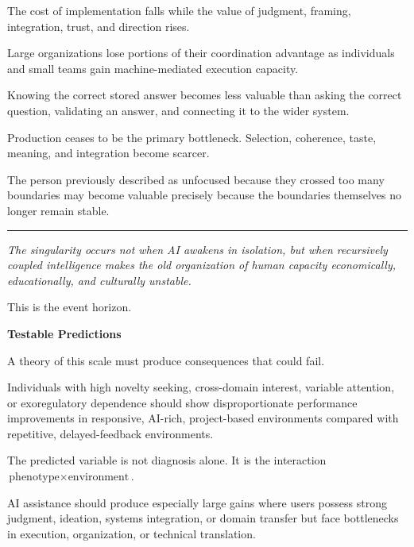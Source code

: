\documentclass[10pt]{article}
\newcommand{\ActiveAccent}{Industrial}
\newcommand{\papersection}[2]{%
  \Needspace{8\baselineskip}
  \vspace{1.1em}
  \noindent\begin{minipage}[t]{0.12\textwidth}
    \vspace{1pt}{\sffamily\bfseries\fontsize{17}{17}\selectfont\textcolor{\ActiveAccent}{#1}}
  \end{minipage}%
  \begin{minipage}[t]{0.86\textwidth}
    {\sffamily\bfseries\fontsize{16.2}{19}\selectfont #2}\par
    \vspace{0.35em}{\color{\ActiveAccent}\rule{\linewidth}{1.15pt}}
  \end{minipage}
  \vspace{0.55em}
}
\newcommand{\subhead}[1]{\Needspace{4\baselineskip}\vspace{0.5em}{\sffamily\bfseries\fontsize{10.5}{13}\selectfont\textcolor{\ActiveAccent}{#1}}\par\vspace{-0.1em}}
\newcommand{\pullquote}[1]{%
  \begin{center}\vspace{0.45em}
  \begin{minipage}{0.88\linewidth}
  {\color{\ActiveAccent}\rule{0.28in}{2.2pt}}\par\vspace{0.45em}
  {\fontsize{13.5}{18}\selectfont\itshape #1}\par
  \vspace{0.5em}{\color{\ActiveAccent}\rule{0.28in}{2.2pt}}
  \end{minipage}\vspace{0.45em}\end{center}
}
\begin{document}
\subhead{Economic inversion}
The cost of implementation falls while the value of judgment, framing, integration, trust, and direction rises.

\subhead{Institutional inversion}
Large organizations lose portions of their coordination advantage as individuals and small teams gain machine-mediated execution capacity.

\subhead{Epistemic inversion}
Knowing the correct stored answer becomes less valuable than asking the correct question, validating an answer, and connecting it to the wider system.

\subhead{Creative inversion}
Production ceases to be the primary bottleneck. Selection, coherence, taste, meaning, and integration become scarcer.

\subhead{Identity inversion}
The person previously described as unfocused because they crossed too many boundaries may become valuable precisely because the boundaries themselves no longer remain stable.

\pullquote{The singularity occurs not when AI awakens in isolation, but when recursively coupled intelligence makes the old organization of human capacity economically, educationally, and culturally unstable.}

This is the event horizon.

\papersection{XI}{Testable Predictions}

A theory of this scale must produce consequences that could fail.

\subhead{1. Environment-sensitive performance inversion}

Individuals with high novelty seeking, cross-domain interest, variable attention, or exoregulatory dependence should show disproportionate performance improvements in responsive, AI-rich, project-based environments compared with repetitive, delayed-feedback environments.

The predicted variable is not diagnosis alone. It is the interaction $\text{phenotype}\times\text{environment}$.

\subhead{2. AI should benefit integrative profiles differently}

AI assistance should produce especially large gains where users possess strong judgment, ideation, systems integration, or domain transfer but face bottlenecks in execution, organization, or technical translation.

\subhead{3. Unbounded AI coupling should destabilize some of the same users}
\end{document}
